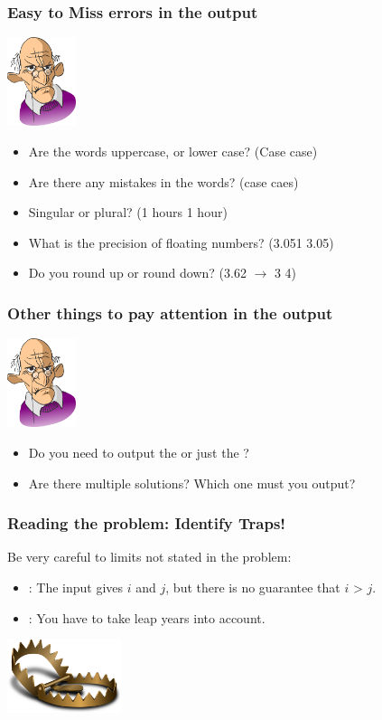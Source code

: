 \documentclass{beamer}
\begin{document}
\begin{frame}
  \frametitle{Easy to Miss errors in the output}

  \includegraphics[width=0.15\textwidth]{../img/angryclient}
  \begin{itemize}
  \item Are the words uppercase, or lower case? (Case  case)
  \item Are there any mistakes in the words? (case  caes)
  \item Singular or plural? (1 hours  1 hour)
  \item What is the precision of floating numbers? (3.051  3.05)
  \item Do you round up or round down? (3.62 $\rightarrow$ 3  4)
  \end{itemize}
\end{frame}

\begin{frame}
  \frametitle{Other things to pay attention in the output}
  \includegraphics[width=0.15\textwidth]{../img/angryclient}
  \begin{itemize}
  \item Do you need to output the  or just
    the ?
  \item Are there multiple solutions? Which one must you output?
  \end{itemize}
\end{frame}

\begin{frame}
  \frametitle{Reading the problem: Identify Traps!}
  Be very careful to limits \alert{not stated} in the problem:
  \begin{itemize}
    \item {}: The input gives $i$ and $j$, but there is
      no guarantee that $i$ > $j$.
    \item {}: You have to take leap years
      into account.
  \end{itemize}

  \vfill

  \hfill \includegraphics[width=0.25\textwidth]{../img/trap}
\end{frame}
\end{document}
